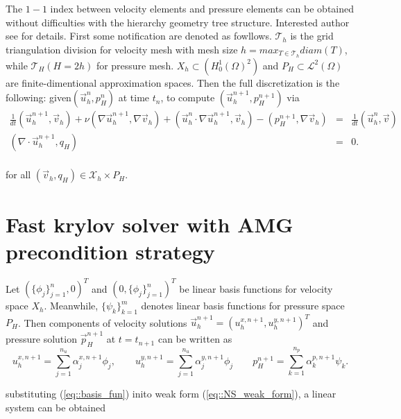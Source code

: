 \documentclass{eajam}
\begin{document}
   The $1-1$ index between velocity elements and pressure elements can
   be obtained without difficulties with the hierarchy geometry tree
   structure. Interested author see \cite{Wu2016moving} for
   details. First some notification are denoted as
   fowllows. $\mathcal{T}_h$ is the grid triangulation
   division for velocity mesh with mesh size $h = max_{T \in
     \mathcal{T}_h} diam(T)$, while $\mathcal{T}_{H}(H = 2h)$ for
   pressure mesh. $X_h \subset (H_0^1(\Omega)^2)$ and
   $P_H \subset \mathcal{L}^2(\Omega)$ are finite-dimentional
   approximation spaces. Then the full discretization is the
   following: given$(\vec{u}_h^n, p_H^n)$ at time $t_n$, to compute
   $(\vec{u}_h^{n + 1}, p_H^{n + 1})$ via 
   \begin{equation}
     \begin{aligned}
       \frac{1}{dt}(\vec{u}_h^{n + 1}, \vec{v}_h) + \nu (\nabla
       \vec{u}_h^{n + 1}, \nabla \vec{v}_h) + (\vec{u}_h^n \cdot
       \nabla \vec{u}_h^{n + 1}, \vec{v}_h) - (p_H^{n + 1}, \nabla
       \vec{v}_h) & = &\frac{1}{dt}(\vec{u}_h^n, \vec{v}) \\
       (\nabla \cdot \vec{u}_h^{n + 1}, q_H) & = & 0. \\
     \end{aligned}
     \label{eq::NS_weak_form}
   \end{equation}
   
   for all $(\vec{v}_h, q_H) \in \mathcal{X}_h \times P_H$.

\section{Fast krylov solver with AMG precondition strategy}
  \label{sec3} Let $\left(\{\phi_j \}_{j = 1}^n, 0 \right)^T$ and
  $\left(0, \{\phi_j\}_{j = 1}^n\right)^T$ be linear basis functions
  for velocity space $X_h$. Meanwhile, $\{\psi_k\}_{k =
    1}^m$ denotes linear basis functions for pressure space
  $P_H$. Then components of velocity solutions
  $\vec{u}_h^{n + 1} = (u_h^{x, n + 1}, u_h^{y, n + 1})^T$ and pressure
  solution $\vec{p}_H^{n + 1}$ at $t = t_{n + 1}$ can be written as 
  \begin{equation}
    u_h^{x, n + 1} = \sum_{j = 1}^{n_u} \alpha_j^{x, n + 1} \phi_j,
    \qquad u_h^{y, n + 1} = \sum_{j = 1}^{n_u} \alpha_j^{y, n + 1}
    \phi_j \qquad p_H^{n + 1} = \sum_{k = 1}^{n_p}\alpha_k^{p, n + 1}
    \psi_k.
    \label{eq::basis_fun}
  \end{equation}
  
  substituting (\ref{eq::basis_fun}) inito weak form
  (\ref{eq::NS_weak_form}), a linear system can be obtained
  
\end{document}
